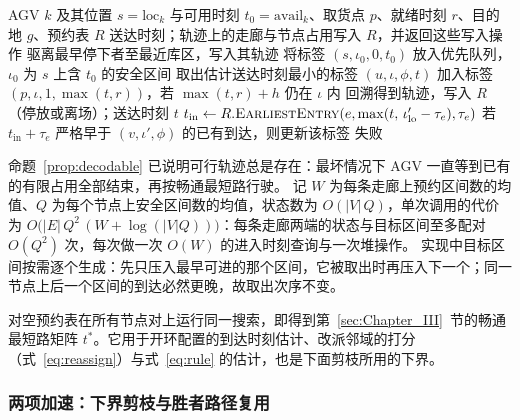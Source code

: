 \documentclass[manuscript,screen,review]{acmart}
\begin{document}
\begin{algorithm}[t]
  \caption{\textsc{PlanTask}：一个运输任务的无冲突轨迹规划}
  \label{alg:route}
  \small
  \begin{algorithmic}[1]
  \Require AGV $k$ 及其位置 $s=\mathrm{loc}_k$ 与可用时刻 $t_0=\mathrm{avail}_k$、取货点 $p$、就绪时刻 $r$、目的地 $g$、预约表 $R$
  \Ensure 送达时刻；轨迹上的走廊与节点占用写入 $R$，并返回这些写入操作
     \State 驱离最早停下者至最近库区，写入其轨迹 \EndIf
  \EndFor
  \State 将标签 $(s,\iota_0,0,t_0)$ 放入优先队列，$\iota_0$ 为 $s$ 上含 $t_0$ 的安全区间
    \State 取出估计送达时刻最小的标签 $(u,\iota,\phi,t)$
     \State 加入标签 $(p,\iota,1,\max(t,r))$，若 $\max(t,r)+h$ 仍在 $\iota$ 内
            \EndIf
      \State 回溯得到轨迹，写入 $R$（停放或离场）；\Return 送达时刻 $t$
    \EndIf
      \State $t_{\text{in}} \gets R.\textsc{EarliestEntry}(e,\max(t,\,\iota'_{\mathrm{lo}}-\tau_e),\tau_e)$
        \State 若 $t_{\text{in}}+\tau_e$ 严格早于 $(v,\iota',\phi)$ 的已有到达，则更新该标签
      \EndIf
    \EndFor
  \EndWhile
  \State \Return 失败 
  \end{algorithmic}
\end{algorithm}

命题~\ref{prop:decodable} 已说明可行轨迹总是存在：最坏情况下 AGV 一直等到已有的有限占用全部结束，再按畅通最短路行驶。
记 $W$ 为每条走廊上预约区间数的均值、$Q$ 为每个节点上安全区间数的均值，状态数为 $O(|V|\,Q)$，单次调用的代价为 $O\bigl(|E|\,Q^{2}\,(W+\log(|V|Q))\bigr)$：每条走廊两端的状态与目标区间至多配对 $O(Q^{2})$ 次，每次做一次 $O(W)$ 的进入时刻查询与一次堆操作。
实现中目标区间按需逐个生成：先只压入最早可进的那个区间，它被取出时再压入下一个；同一节点上后一个区间的到达必然更晚，故取出次序不变。

对空预约表在所有节点对上运行同一搜索，即得到第~\ref{sec:Chapter_III}~节的畅通最短路矩阵 $t^{*}$。它用于开环配置的到达时刻估计、改派邻域的打分（式~\eqref{eq:reassign}）与式~\eqref{eq:rule} 的估计，也是下面剪枝所用的下界。

\subsubsection{两项加速：下界剪枝与胜者路径复用}
\label{sec:speedup}
\end{document}
